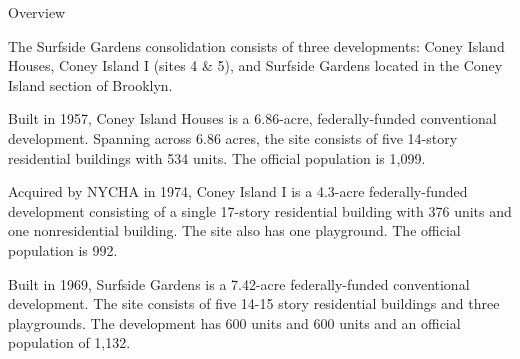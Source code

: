 Overview 

The Surfside Gardens consolidation consists of three developments: Coney Island Houses, Coney Island I (sites 4 & 5), and Surfside Gardens located in the Coney Island section of Brooklyn. 

Built in 1957, Coney Island Houses is a 6.86-acre, federally-funded conventional development. Spanning across 6.86 acres, the site consists of five 14-story residential buildings with 534 units. The official population is 1,099.

Acquired by NYCHA in 1974, Coney Island I is a 4.3-acre federally-funded development consisting of a single 17-story residential building with 376 units and one nonresidential building. The site also has one playground. The official population is 992.

Built in 1969, Surfside Gardens is a 7.42-acre federally-funded conventional development. The site consists of five 14-15 story residential buildings and three playgrounds. The development has 600 units and 600 units and an official population of 1,132.